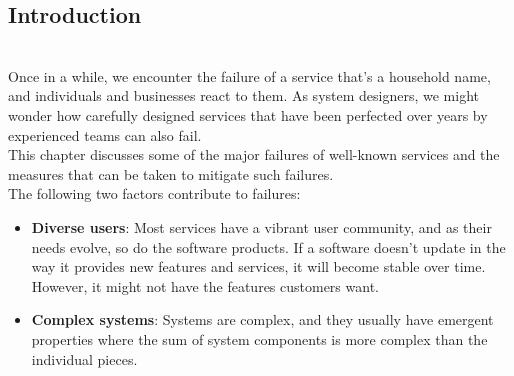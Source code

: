 

\subsection{Introduction}\label{cb_mJdYvboRIP28aQqYFx}
\\
Once in a while, we encounter the failure of a service that's a household name, and individuals and businesses react to them. As system designers, we might wonder how carefully designed services that have been perfected over years by experienced teams can also fail.\\
This chapter discusses some of the major failures of well-known services and the measures that can be taken to mitigate such failures.
\\
The following two factors contribute to failures:

\begin{itemize}
\item
\protect{}\label{s4fOF43z-H5uivUJXO0Gr}
\textbf{Diverse users}: Most services have a vibrant user community, and as their needs evolve, so do the software products. If a software doesn't update in the way it provides new features and services, it will become stable over time. However, it might not have the features customers want.
\item
\protect{}\label{dOp74EPhhCalYTpc_JiOU}
\textbf{Complex systems}: Systems are complex, and they usually have emergent properties where the sum of system components is more complex than the individual pieces.
\end{itemize}

\noindent
\begin{minipage}[t]{0.48\textwidth}\vspace{0pt}

\end{minipage}
\hfill
\begin{minipage}[t]{0.48\textwidth}\vspace{0pt}

\end{minipage}

